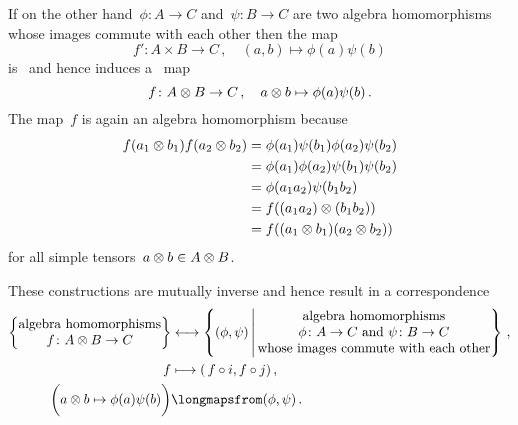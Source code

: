 \begin{recall}
  If on the other hand~$\phi \colon A \to C$ and~$\psi \colon B \to C$ are two algebra homomorphisms whose images commute with each other then the map
  \[
    f'
    \colon
    A \times B
    \to
    C \,,
    \quad
    (a,b)
    \mapsto
    \phi(a) \psi(b)
  \]
  is~{\bilinear{$\kf$}} and hence induces a~{\linear{$\kf$}} map
  \[
    f
    \colon
    A \otimes B
    \to
    C \,,
    \quad
    a \otimes b
    \mapsto
    \phi(a) \psi(b) \,.
  \]
  The map~$f$ is again an algebra homomorphism because
  \begin{align*}
    f(a_1 \otimes b_1) f(a_2 \otimes b_2)
    &=
    \phi(a_1) \psi(b_1) \phi(a_2) \psi(b_2)
    \\
    &=
    \phi(a_1) \phi(a_2) \psi(b_1) \psi(b_2)
    \\
    &=
    \phi(a_1 a_2) \psi(b_1 b_2)
    \\
    &=
    f( (a_1 a_2) \otimes (b_1 b_2) )
    \\
    &=
    f( (a_1 \otimes b_1) (a_2 \otimes b_2) )
  \end{align*}
  for all simple tensors~$a \otimes b \in A \otimes B$.
  
  These constructions are mutually inverse and hence result in a {\onetoone} correspondence
  \begin{align*}
    \left\{
      \begin{tabular}{@{}c@{}}
        algebra homomorphisms \\
        $f \colon A \tensor B \to C$
      \end{tabular}
    \right\}
    &\longonetoone
    \left\{
      (\phi, \psi)
    \suchthat*
      \begin{tabular}{@{}c@{}}
        algebra homomorphisms \\
        $\phi \colon A \to C$ and~$\psi \colon B \to C$ \\
        whose images commute with each other
      \end{tabular}
    \right\}  \,,
    \\
    f
    &\longmapsto
    (\spacing f \circ i, f \circ j)  \,,
    \\
    \biggl( a \tensor b \mapsto \phi(a)\psi(b) \biggr)
    &\longmapsfrom
    (\phi, \psi)  \,.
  \end{align*}
\end{recall}


